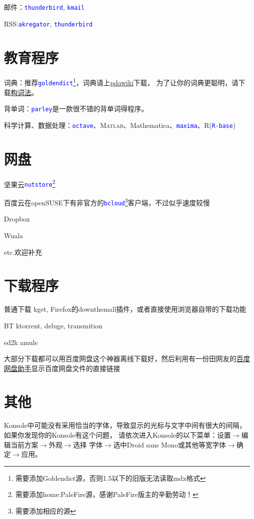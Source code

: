 \documentclass[11pt]{article}
\newcommand{\soft}[1]{\texttt{\textcolor{blue}{#1}}}
\begin{document}
邮件：\soft{thunderbird}, \soft{kmail}

RSS:\soft{akregator}, \soft{thunderbird}
\section{教育程序}
词典：推荐\soft{goldendict}\footnote{需要添加Goldendict源，否则1.5以下的旧版无法读取mdx格式}，词典请上\href{http://pdawiki.com/forum/forum.php}{pdawiki}下载，
为了让你的词典更聪明，请下载\href{https://zpj.blog.ustc.edu.cn/wp-content/uploads/2014/02/wordsrule.tar.gz}{构词法}。

背单词：\soft{parley}是一款很不错的背单词得程序。

科学计算、数据处理：\soft{octave}、\textsc{Matlab}、Mathematica、\soft{maxima}、R(\soft{R-base})
\section{网盘}
\begin{compactitem}
 \item 坚果云\soft{nutstore}\footnote{需要添加home:PaleFire源，感谢PaleFire版主的辛勤劳动！}
 \item 百度云在openSUSE下有非官方的\soft{bcloud}\footnote{需要添加相应的源}客户端，不过似乎速度较慢
 \item Dropbox
 \item Wuala
 \item etc.欢迎补充
\end{compactitem}
\section{下载程序}
\begin{compactdesc}
 \item[普通下载] kget, Firefox的down\-them\-all插件，或者直接使用浏览器自带的下载功能
 \item[BT] ktorrent, deluge, transmition
 \item[ed2k] amule
\end{compactdesc}

大部分下载都可以用百度网盘这个神器离线下载好，然后利用有一份田网友的\href{http://git.oschina.net/youyifentian/dupanlink}{百度网盘助手}显示百度网盘文件的直接链接
\section{其他}
Konsole中可能没有采用恰当的字体，导致显示的光标与文字中间有很大的间隔，如果你发现你的Konsole有这个问题，
请依次进入Konsole的以下菜单：设置$\rightarrow$编辑当前方案$\rightarrow$外观$\rightarrow$选择
字体$\rightarrow$选中Droid sans Mono或其他等宽字体$\rightarrow$确定$\rightarrow$应用。
\end{document}
